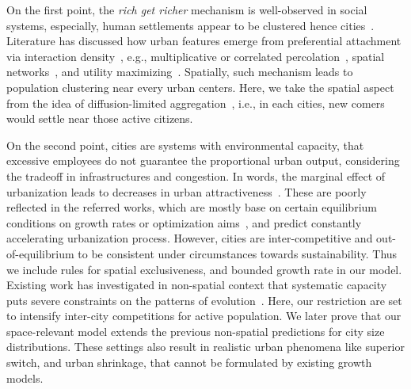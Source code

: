 \documentclass[reprint,unsortedaddress,amsmath,amssymb,aps,prl,showkeys]{revtex4-2}
\begin{document}
On the first point, the \textit{rich get richer} mechanism is well-observed in social systems, especially, human settlements appear to be clustered hence cities~\cite{marsili1998interacting}. Literature has discussed how urban features emerge from preferential attachment via interaction density~\cite{ccolak2016understanding,louf2014congestion,fujita1976spatial}, e.g., multiplicative or correlated percolation~\cite{makse1995modelling,PhysRevE.58.7054,rybski2013distance}, spatial networks~\cite{marsili1998interacting,court2013origins,Li2017Simple}, and utility maximizing~\cite{PhysRevE.90.042815,axtell2001emergent}. Spatially, such mechanism leads to population clustering near every urban centers. Here, we take the spatial aspect from the idea of diffusion-limited aggregation~\cite{makse1995modelling, rybski2013distance, kleinberg2000navigation}, i.e., in each cities, new comers would settle near those active citizens.

On the second point, cities are systems with environmental capacity, that excessive employees do not guarantee the proportional urban output, considering the tradeoff in infrastructures and congestion. In words, the marginal effect of urbanization leads to decreases in urban attractiveness~\cite{atkinson2012urban, girardin2009quantifying,gomez2018explaining,parris2003characterizing,batty2008size}. These are poorly reflected in the referred works, which are mostly base on certain equilibrium conditions on growth rates or optimization aims~\cite{zipf1949human}, and predict constantly accelerating urbanization process. However, cities are inter-competitive and out-of-equilibrium to be consistent under circumstances towards sustainability\cite{fujita1976spatial,louf2014congestion,ccolak2016understanding}. Thus we include rules for spatial exclusiveness, and bounded growth rate in our model. Existing work has investigated in non-spatial context that systematic capacity puts severe constraints on the patterns of evolution~\cite{PhysRevE.55.R3817}. Here, our restriction are set to intensify inter-city competitions for active population\cite{batty2017urban}. We later prove that our space-relevant model extends the previous non-spatial predictions for city size distributions. These settings also result in realistic urban phenomena like superior switch\cite{gabaix2004evolution}, and urban shrinkage\cite{haase2014conceptualizing}, that cannot be formulated by existing growth models.
\end{document}
